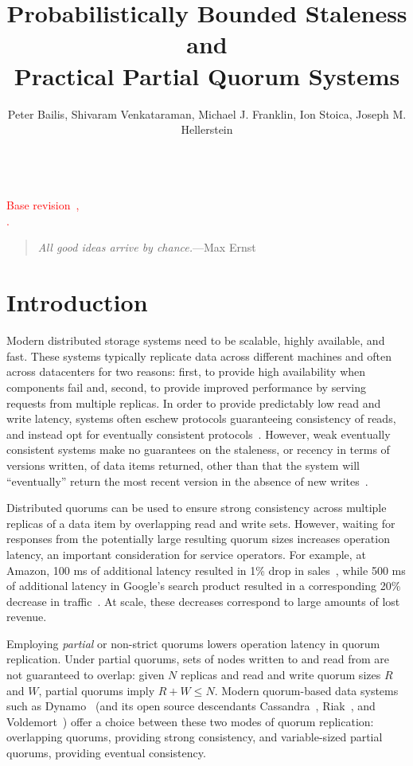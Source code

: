 \documentclass{vldb}
\title{Probabilistically Bounded Staleness and\\ Practical Partial Quorum Systems}
\author{Peter Bailis, Shivaram Venkataraman, Michael J. Franklin, Ion Stoica, Joseph M. Hellerstein\\
\affaddr{University of California, Berkeley}\\
\affaddr{\{pbailis, shivaram, franklin, stoica, hellerstein\}@cs.berkeley.edu}}
\begin{document}

\maketitle


\noindent\textcolor{red}{Base revision~\GITAbrHash,~\GITAuthorDate\\\GITAuthorName.}

\begin{quote}
\textit{All good ideas arrive by chance.}---Max Ernst
\end{quote}



\section{Introduction}

Modern distributed storage systems need to be scalable, highly
available, and fast.  These systems typically replicate data across
different machines and often across datacenters for two reasons:
first, to provide high availability when components fail and, second,
to provide improved performance by serving requests from multiple
replicas.  In order to provide predictably low read and write latency,
systems often eschew protocols guaranteeing consistency of reads, and
instead opt for eventually consistent
protocols~\cite{cassandradefault, abadilatconsist, dynamo, feinbergpc,
  reddit, riaktalkone, outbrain}.  However, weak eventually consistent
systems make no guarantees on the staleness, or recency in terms of
versions written, of data items returned, other than that the system
will ``eventually'' return the most recent version in the absence of
new writes~\cite{vogels-defs}.

Distributed quorums can be used to ensure strong consistency across
multiple replicas of a data item by overlapping read and write
sets. However, waiting for responses from the potentially large
resulting quorum sizes increases operation latency, an important
consideration for service operators. For example, at Amazon, 100 ms of
additional latency resulted in 1\% drop in
sales~\cite{amazon-latency}, while 500 ms of additional latency in
Google's search product resulted in a corresponding 20\% decrease in
traffic~\cite{google-talk}.  At scale, these decreases correspond to
large amounts of lost revenue.

Employing \textit{partial} or non-strict quorums lowers operation
latency in quorum replication.  Under partial quorums, sets of nodes
written to and read from are not guaranteed to overlap: given $N$
replicas and read and write quorum sizes $R$ and $W$, partial quorums
imply $R+W \leq N$.  Modern quorum-based data systems such as
Dynamo~\cite{dynamo} (and its open source descendants
Cassandra~\cite{cassandra}, Riak~\cite{riak}, and
Voldemort~\cite{voldemort}) offer a choice between these two modes of
quorum replication: overlapping quorums, providing strong consistency,
and variable-sized partial quorums, providing eventual consistency.
\end{document}
